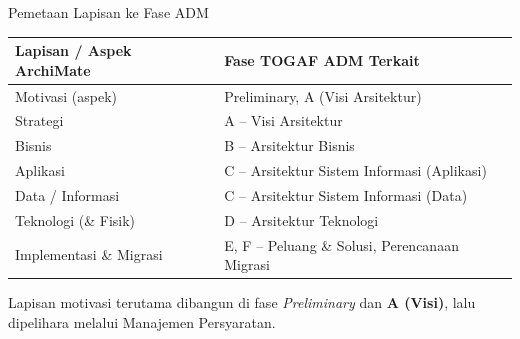 \documentclass[aspectratio=169, table]{beamer}
\newcommand{\takeaway}[1]{%
  \vspace{4pt}
  {\footnotesize #1}
}
\begin{document}
\begin{frame}{Pemetaan Lapisan ke Fase ADM}
  \vspace{2pt}
  \scriptsize
  \setlength{\extrarowheight}{2pt}
  \setlength{\arrayrulewidth}{0.4pt}
  \begin{tabularx}{\textwidth}{|p{}|X|}
    \hline
    \rowcolor{praditagreen!18}
    \textbf{Lapisan / Aspek ArchiMate} & \textbf{Fase TOGAF ADM Terkait} \\
    \hline
    Motivasi (aspek) & Preliminary, A (Visi Arsitektur) \\
    \hline
    Strategi & A -- Visi Arsitektur \\
    \hline
    Bisnis & B -- Arsitektur Bisnis \\
    \hline
    Aplikasi & C -- Arsitektur Sistem Informasi (Aplikasi) \\
    \hline
    Data / Informasi & C -- Arsitektur Sistem Informasi (Data) \\
    \hline
    Teknologi (\& Fisik) & D -- Arsitektur Teknologi \\
    \hline
    Implementasi \& Migrasi & E, F -- Peluang \& Solusi, Perencanaan Migrasi \\
    \hline
  \end{tabularx}

  \vspace{4pt}
  \takeaway{Lapisan motivasi terutama dibangun di fase \emph{Preliminary} dan
  \textbf{A (Visi)}, lalu dipelihara melalui Manajemen Persyaratan.}
\end{frame}
\end{document}
